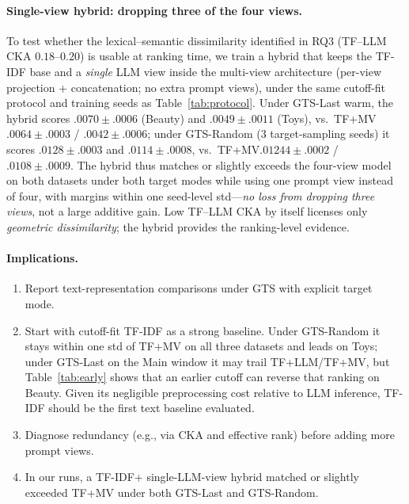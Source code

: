 \documentclass[sigconf,natbib=true,anonymous]{acmart}
\newcommand{\tfidf}{\textsc{TF-IDF}\xspace}
\newcommand{\tfllm}{\textsc{TF+LLM}\xspace}
\newcommand{\tfmv}{\textsc{TF+MV}\xspace}
\begin{document}
\paragraph{Single-view hybrid: dropping three of the four views.}
To test whether the lexical--semantic dissimilarity identified in RQ3 (TF--LLM CKA $0.18$--$0.20$) is usable at ranking time, we train a hybrid that keeps the \tfidf base and a \emph{single} LLM view inside the multi-view architecture (per-view projection + concatena\-tion; no extra prompt views), under the same cutoff-fit protocol and training seeds as Table~\ref{tab:protocol}.
Under GTS-Last warm, the hybrid scores $.0070\pm.0006$ (Beauty) and $.0049\pm.0011$ (Toys), vs.\ \tfmv $.0064\pm.0003$ / $.0042\pm.0006$; under GTS-Random (3 target-sampling seeds) it scores $.0128\pm.0003$ and $.0114\pm.0008$, vs.\ \tfmv $.01244\pm.0002$ / $.0108\pm.0009$.
The hybrid thus matches or slightly exceeds the four-view model on both datasets under both target modes while using one prompt view instead of four, with margins within one seed-level std---\emph{no loss from dropping three views}, not a large additive gain.
Low TF--LLM CKA by itself licenses only \emph{geometric dissimilarity}; the hybrid provides the ranking-level evidence.

\paragraph{Implications.}
\begin{enumerate}[leftmargin=*,itemsep=2pt]
\item Report text-representation comparisons under GTS with explicit target mode.
\item Start with cutoff-fit \tfidf as a strong baseline.  Under GTS-Random it stays within one std of \tfmv on all three datasets and leads on Toys; under GTS-Last on the Main window it may trail \tfllm/\tfmv, but Table~\ref{tab:early} shows that an earlier cutoff can reverse that ranking on Beauty.  Given its negligible preprocessing cost relative to LLM inference, TF-IDF should be the first text baseline evaluated.
\item Diagnose redundancy (e.g., via CKA and effective rank) before adding more prompt views.
\item In our runs, a \tfidf + single-LLM-view hybrid matched or slightly exceeded \tfmv under both GTS-Last and GTS-Random.
\end{enumerate}
\end{document}
